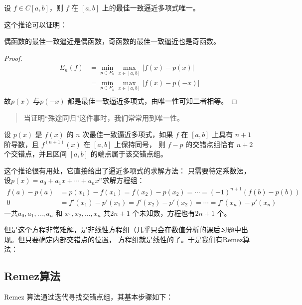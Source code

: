 \begin{corollary}[唯一性]
    设 \(f \in C[a, b]\)，则 \(f\) 在 \([a, b]\) 上的最佳一致逼近多项式唯一。
\end{corollary}
这个推论可以证明：
\begin{theorem}
    偶函数的最佳一致逼近是偶函数，奇函数的最佳一致逼近也是奇函数。
\end{theorem}

\begin{proof}
    \begin{align*}
        E_{n}(f) &= \min_{p \in P_{n}} \max_{x \in [a, b]} |f(x) - p(x)| \\
        &= \min_{p \in P_{n}} \max_{x \in [a, b]} |f(x) - p(-x)| \\
    \end{align*}
    故\(p(x)\) 与\(p(-x)\) 都是最佳一致逼近多项式，由唯一性可知二者相等。
\end{proof}

\begin{quote}
    当证明“殊途同归”这件事时，我们常常用到唯一性。
\end{quote}

\begin{corollary}
    设 \(p(x)\) 是 \(f(x)\) 的 \(n\) 次最佳一致逼近多项式，如果
    \(f\) 在 \([a,b]\) 上具有 \(n+1\) 阶导数，且 \(f^{(n+1)}(x)\) 在 \([a,b]\) 上保持同号，
    则 \(f-p\) 的交错点组恰有 \(n+2\) 个交错点，并且区间 \([a,b]\) 的端点属于该交错点组。
\end{corollary}

这个推论很有用处，它直接给出了逼近多项式的求解方法：
只需要待定系数法，设\(p(x) = a_{0} + a_{1}x + \cdots + a_{n}x^{n}\)求解方程组：
\begin{align*}
    f(a) - p(a) &= p(x_{1}) - f(x_{1}) = f(x_{2}) - p(x_{2}) = \cdots
    = (-1)^{n+1} (f(b) - p(b))\\
    0 &=f'(x_{1}) - p'(x_{1}) = f'(x_{2}) - p'(x_{2}) = \cdots =
    f'(x_{n}) - p'(x_{n})
\end{align*}
一共\(a_{0}, a_{1}, \dots , a_{n}\) 和 \(x_{1}, x_{2}, \dots, x_{n}\)
共\(2n+1\) 个未知数，方程也有\(2n+1\) 个。

但是这个方程非常难解，是非线性方程组（几乎只会在数值分析的课后习题中出现。但只要确定内部交错点的位置，
方程组就是线性的了。于是我们有Remez算法：
\subsection*{Remez算法}
Remez 算法通过迭代寻找交错点组，其基本步骤如下：

